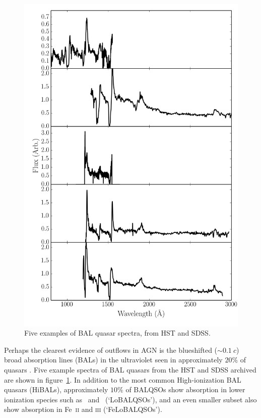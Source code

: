 \begin{figure}
\centering
\includegraphics[width=1.0\textwidth]{figures/02-outflows/bal_spectra.png}
\caption
{
Five examples of BAL quasar spectra, from HST and SDSS.
} 
\label{fig:bals}
\end{figure}

Perhaps the clearest evidence of outflows in AGN is  
the blueshifted ($\sim 0.1~c$) broad absorption lines (BALs) in the 
ultraviolet seen in approximately $20\%$ of quasars
\citep{weymann1991, knigge2008, allen2011}. Five example
spectra of BAL quasars from the HST and SDSS archived are shown in 
figure~\ref{fig:bals}. In addition to the most common High-ionization
BAL quasars (HiBALs), approximately $10\%$ of BALQSOs show absorption
in lower ionization species such as \mgii\ and \aliii\ (`LoBALQSOs'),
and an even smaller subset also show absorption in Fe~\textsc{ii} and 
\textsc{iii} (`FeLoBALQSOs'). 

